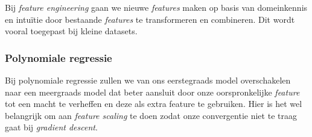 Bij \textit{feature engineering} gaan we nieuwe \textit{features} maken op basis van domeinkennis en intuïtie door bestaande \textit{features} te transformeren en combineren. Dit wordt vooral toegepast bij kleine datasets.

\subsubsection{Polynomiale regressie}

Bij polynomiale regressie zullen we van ons eerstegraads model overschakelen naar een meergraads model dat beter aansluit door onze oorspronkelijke \textit{feature} tot een macht te verheffen en deze als extra feature te gebruiken. Hier is het wel belangrijk om aan \textit{feature scaling} te doen zodat onze convergentie niet te traag gaat bij \textit{gradient descent}.
